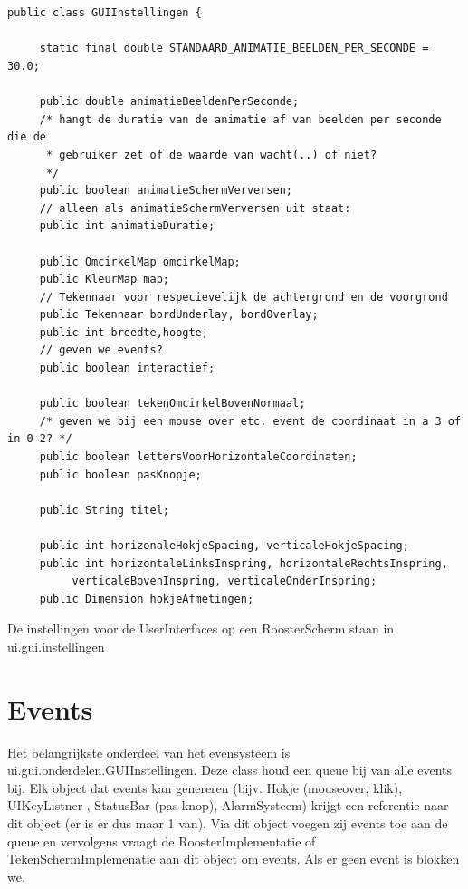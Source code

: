 \documentclass[a4paper,10pt]{article}
\begin{document}
\begin{verbatim}
 

public class GUIInstellingen {
     
     static final double STANDAARD_ANIMATIE_BEELDEN_PER_SECONDE = 30.0;
     
     public double animatieBeeldenPerSeconde;
     /* hangt de duratie van de animatie af van beelden per seconde die de
      * gebruiker zet of de waarde van wacht(..) of niet?
      */
     public boolean animatieSchermVerversen;
     // alleen als animatieSchermVerversen uit staat:
     public int animatieDuratie;
     
     public OmcirkelMap omcirkelMap;
     public KleurMap map;
     // Tekennaar voor respecievelijk de achtergrond en de voorgrond
     public Tekennaar bordUnderlay, bordOverlay;
     public int breedte,hoogte;
     // geven we events?
     public boolean interactief;
     
     public boolean tekenOmcirkelBovenNormaal;
     /* geven we bij een mouse over etc. event de coordinaat in a 3 of in 0 2? */
     public boolean lettersVoorHorizontaleCoordinaten;
     public boolean pasKnopje;
     
     public String titel;
     
     public int horizonaleHokjeSpacing, verticaleHokjeSpacing;
     public int horizontaleLinksInspring, horizontaleRechtsInspring,
          verticaleBovenInspring, verticaleOnderInspring;
     public Dimension hokjeAfmetingen;
\end{verbatim}

De instellingen voor de UserInterfaces op een RoosterScherm staan in ui.gui.instellingen

\section{Events}

Het belangrijkste onderdeel van het evensysteem is ui.gui.onderdelen.GUIInstellingen. Deze class houd een queue bij van alle events bij. Elk object dat events kan genereren (bijv. Hokje (mouseover, klik), UIKeyListner , StatusBar (pas knop), AlarmSysteem) krijgt een referentie naar dit object (er is er dus maar 1 van). Via dit object voegen zij events toe aan de queue en vervolgens vraagt de RoosterImplementatie of TekenSchermImplemenatie aan dit object om events. Als er geen event is blokken we. 
\end{document}
